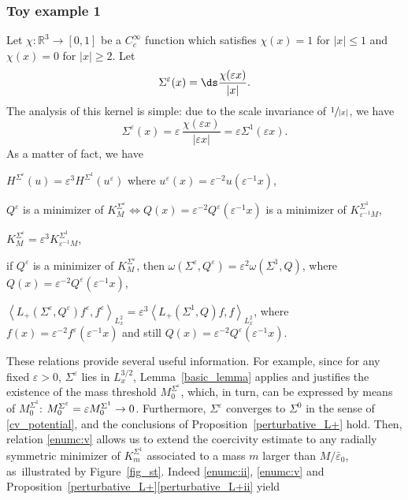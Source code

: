 \subsubsection*{Toy example 1} Let
$\chi:\mathbb R^3\to [0,1]$ be a $C^\infty_c$ function which satisfies
$\chi(x)= 1$ for $|x|\leq 1$ and $\chi(x)=0$ for $|x|\geq 2$.
Let
\[
\Sigma^{\varepsilon}(x)=\ds\frac{\chi(\varepsilon x)}{|x|}.
\]
The analysis of this kernel is simple: due to the scale invariance of $\sfrac{1}{|x|}$, we have
\[
\Sigma^{\varepsilon}(x)=\varepsilon\,\frac{\chi(\varepsilon x)}{|\varepsilon x|}=\varepsilon\Sigma^{1}(\varepsilon x).
\]
As a matter of fact, we have
\begin{enumeratei}
\item\label{enumc:i}
$H^{\Sigma^{\varepsilon}}(u)=\varepsilon^{3}H^{\Sigma^{1}}(u^{\varepsilon})$ where $u^{\varepsilon}(x)=\varepsilon^{-2}u(\varepsilon^{-1}x)$,
\item\label{enumc:ii}
$Q^{\varepsilon}$ is a minimizer of $K_{M}^{\Sigma^{\varepsilon}}\Leftrightarrow Q(x)=\varepsilon^{-2}Q^{\varepsilon}(\varepsilon^{-1}x)$ is a minimizer of $K_{\varepsilon^{-1}M}^{\Sigma^{1}}$,
\item\label{enumc:iii}
$K_{M}^{\Sigma^{\varepsilon}}=\varepsilon^{3}K_{\varepsilon^{-1}M}^{\Sigma^{1}}$,
\item\label{enumc:iv}
if $Q^{\varepsilon}$ is a minimizer of $K_{M}^{\Sigma^{\varepsilon}}$, then $\omega(\Sigma^{\varepsilon},Q^{\varepsilon})=\varepsilon^{2}\omega(\Sigma^{1},Q)$, where $Q(x)=\varepsilon^{-2}Q^{\varepsilon}(\varepsilon^{-1}x)$,
\item\label{enumc:v}
$\left\langle L_{+}(\Sigma^{\varepsilon},Q^{\varepsilon})f^{\varepsilon},f^{\varepsilon}\right\rangle_{L_{x}^{2}}=\varepsilon^{3}\left\langle L_{+}(\Sigma^{1},Q)f,f\right\rangle_{L_{x}^{2}}$, where $f(x)=\varepsilon^{-2}f^{\varepsilon}(\varepsilon^{-1}x)$ and still $Q(x)=\varepsilon^{-2}Q^{\varepsilon}(\varepsilon^{-1}x)$.
\end{enumeratei}
These relations provide several useful information. For example, since for any fixed $\varepsilon>0$, $\Sigma^{\varepsilon}$ lies in $L_{x}^{3/2}$, Lemma~\ref{basic_lemma} applies and justifies the existence of the mass threshold $M_{0}^{\Sigma^{\varepsilon}}$, which, in turn, can be expressed by means of $M_{0}^{\Sigma^{1}}$:
$M_{0}^{\Sigma^{\varepsilon}}=\varepsilon M_{0}^{\Sigma^{1}}\to\nobreak 0$. Furthermore, $\Sigma^{\varepsilon}$ converges to $\Sigma^{0}$ in the sense of \eqref{cv_potential},
and the
conclusions of Proposition~\ref{perturbative_L+} hold. Then, relation \eqref{enumc:v} allows us to extend the coercivity estimate to any radially symmetric minimizer of $K_{m}^{\Sigma^{1}}$ associated to a mass $m$ larger than $M/\bar{\varepsilon}_{0}$, as~illustrated by Figure~\ref{fig_st}. Indeed \eqref{enumc:ii}, \eqref{enumc:v} and Proposition~\ref{perturbative_L+}\eqref{perturbative_L+ii} yield

